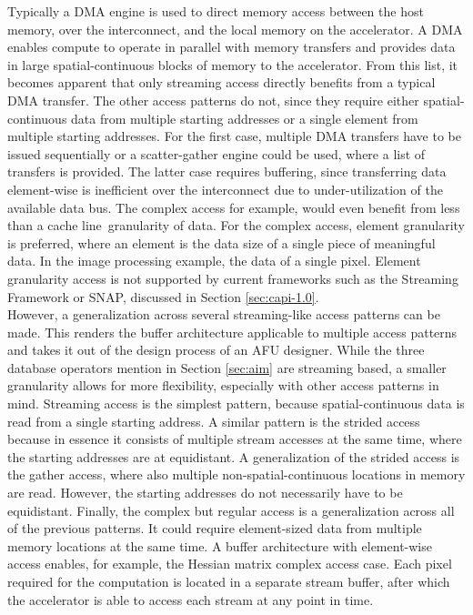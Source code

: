 Typically a DMA engine is used to direct memory access between the host memory, over the interconnect, and the local memory on the accelerator. A DMA enables compute to operate in parallel with memory transfers and provides data in large spatial-continuous blocks of memory to the accelerator. From this list, it becomes apparent that only streaming access directly benefits from a typical DMA transfer. The other access patterns do not, since they require either spatial-continuous data from multiple starting addresses or a single element from multiple starting addresses. For the first case, multiple DMA transfers have to be issued sequentially or a scatter-gather engine could be used, where a list of transfers is provided. The latter case requires buffering, since transferring data element-wise is inefficient over the interconnect due to under-utilization of the available data bus. The complex access for example, would even benefit from less than a cache line\footnotemark~granularity of data. For the complex access, element granularity is preferred, where an element is the data size of a single piece of meaningful data. In the image processing example, the data of a single pixel. Element granularity access is not supported by current frameworks such as the Streaming Framework or SNAP, discussed in Section \ref{sec:capi-1.0}.\\
However, a generalization across several streaming-like access patterns can be made. This renders the buffer architecture applicable to multiple access patterns and takes it out of the design process of an AFU designer. While the three database operators mention in Section \ref{sec:aim} are streaming based, a smaller granularity allows for more flexibility, especially with other access patterns in mind. Streaming access is the simplest pattern, because spatial-continuous data is read from a single starting address. A similar pattern is the strided access because in essence it consists of multiple stream accesses at the same time, where the starting addresses are at equidistant. A generalization of the strided access is the gather access, where also multiple non-spatial-continuous locations in memory are read. However, the starting addresses do not necessarily have to be equidistant. Finally, the complex but regular access is a generalization across all of the previous patterns. It could require element-sized data from multiple memory locations at the same time. A buffer architecture with element-wise access enables, for example, the Hessian matrix complex access case. Each pixel required for the computation is located in a separate stream buffer, after which the accelerator is able to access each stream at any point in time.\\

